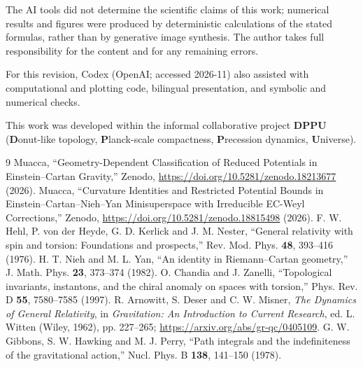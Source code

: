 \documentclass[11pt,a4paper]{article}
\begin{document}
The AI tools did not determine the scientific claims of this work; numerical
results and figures were produced by deterministic calculations of the stated
formulas, rather than by generative image synthesis.  The author
takes full responsibility for the content and for any remaining errors.

For this revision, Codex (OpenAI; accessed 2026-11) also assisted with
computational and plotting code, bilingual presentation, and symbolic and
numerical checks.

This work was developed within the informal collaborative project
\textbf{DPPU} (\textbf{D}onut-like topology, \textbf{P}lanck-scale
compactness, \textbf{P}recession dynamics, \textbf{U}niverse).

\appendix










\begin{thebibliography}{9}
Muacca, ``Geometry-Dependent Classification of Reduced Potentials in
Einstein--Cartan Gravity,'' Zenodo, \url{https://doi.org/10.5281/zenodo.18213677} (2026).
Muacca, ``Curvature Identities and Restricted Potential Bounds in
Einstein--Cartan--Nieh--Yan Minisuperspace with Irreducible EC-Weyl Corrections,''
Zenodo, \url{https://doi.org/10.5281/zenodo.18815498} (2026).
F. W. Hehl, P. von der Heyde, G. D. Kerlick and J. M. Nester,
``General relativity with spin and torsion: Foundations and prospects,''
Rev. Mod. Phys. \textbf{48}, 393--416 (1976).
H. T. Nieh and M. L. Yan, ``An identity in Riemann--Cartan geometry,''
J. Math. Phys. \textbf{23}, 373--374 (1982).
O. Chandia and J. Zanelli, ``Topological invariants, instantons, and the chiral
anomaly on spaces with torsion,'' Phys. Rev. D \textbf{55}, 7580--7585 (1997).
R. Arnowitt, S. Deser and C. W. Misner,
\emph{The Dynamics of General Relativity}, in \emph{Gravitation: An Introduction
to Current Research}, ed. L. Witten (Wiley, 1962), pp. 227--265;
\url{https://arxiv.org/abs/gr-qc/0405109}.
G. W. Gibbons, S. W. Hawking and M. J. Perry,
``Path integrals and the indefiniteness of the gravitational action,''
Nucl. Phys. B \textbf{138}, 141--150 (1978).
\end{thebibliography}
\end{document}
